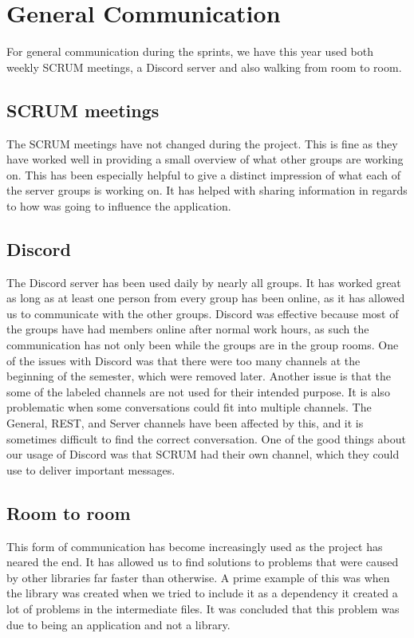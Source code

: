 \section{General Communication}
For general communication during the sprints, we have this year used both weekly
SCRUM meetings, a Discord server and also walking from room to room.

\subsection{SCRUM meetings}
The SCRUM meetings have not changed during the project. This is fine as they
have worked well in providing a small overview of what other groups are working
on. This has been especially helpful to give a distinct impression of what each
of the server groups is working on. It has helped with sharing information in
regards to how  was going to influence the application.

\subsection{Discord}
The Discord server has been used daily by nearly all groups. It has worked
great as long as at least one person from every group has been online, as it
has allowed us to communicate with the other groups. Discord was effective
because most of the groups have had members online after normal work hours, as
such the communication has not only been while the groups are in the group rooms.
One of the issues with Discord was that there were too many channels at the
beginning of the semester, which were removed later. Another issue is that the
some of the labeled channels are not used for their intended purpose. It is
also problematic when some conversations could fit into multiple channels. The
General, REST, and Server channels have been affected by this, and it is
sometimes difficult to find the correct conversation. One of the good things
about our usage of Discord was that SCRUM had their own channel, which they
could use to deliver important messages.

\subsection{Room to room}
This form of communication has become increasingly used as the project has
neared the end. It has allowed us to find solutions to problems that were caused by
other libraries far faster than otherwise. A prime example of this was when the
 library was created when we tried to include it as
a dependency it created a lot of problems in the intermediate files. It was
concluded that this problem was due to  being an
application and not a library.
